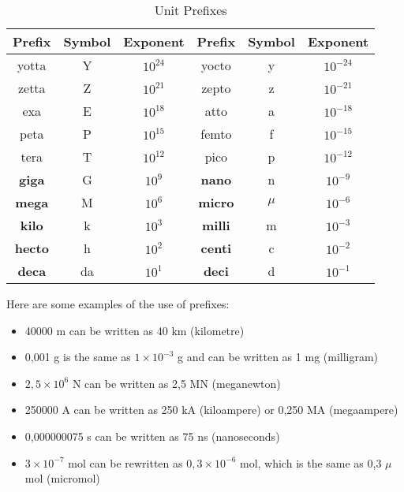 \documentclass[10pt,a4paper,titlepage,twoside,openright]{report}
\begin{document}
\pagebreak[4]
\begin{table}[htbp]
\centering
\begin{tabular}{|c|c|c||c|c|c|}\hline
\textbf{Prefix}& \textbf{Symbol}& \textbf{Exponent}& \textbf{Prefix}& \textbf{Symbol}& \textbf{Exponent} \\\hline
yotta & Y& $10^{24}$ & yocto& y & $10^{- 24}$ \\\hline
zetta & Z & $10^{21}$ & zepto & z & $10^{- 21}$ \\\hline
exa & E & $10^{18}$ & atto & a & $10^{- 18}$ \\\hline
peta & P & $10^{15}$ & femto & f & $10^{- 15}$ \\\hline
tera & T & $10^{12}$ & pico & p & $10^{- 12}$ \\ \hline
{\bf giga} & G & $10^9$ & {\bf nano} & n & $10^{- 9}$ \\ \hline
{\bf mega} & M & $10^6$ & {\bf micro} & $\mu$ & $10^{- 6}$ \\\hline
{\bf kilo} & k & $10^3$ & {\bf milli} & m & $10^{- 3}$ \\\hline
{\bf hecto} & h& $10^2$ & {\bf centi} & c & $10^{- 2}$ \\\hline
{\bf deca} & da & $10^1$ & {\bf deci} & d & $10^{- 1}$ \\ \hline
\end{tabular}
\caption{Unit Prefixes}\label{tab:dim:prefixes}
\end{table}


Here are some examples of the use of prefixes:
\begin{itemize}
\item {40000 m can be written as 40 km (kilometre)}
\item {0,001 g is the same as $1\times10^{-3}$ g and can be written as 1 mg (milligram)}
\item {$2,5\times10^{6}$ N can be written as 2,5 MN (meganewton)}
\item {250000 A can be written as 250 kA (kiloampere) or 0,250 MA (megaampere)}
\item {0,000000075 s can be written as 75 ns (nanoseconds)}
\item {$3\times10^{-7}$ mol can be rewritten as $0,3\times10^{-6}$ mol, which is the same as 0,3 $\mu$mol (micromol)}
\end{itemize}
\end{document}
